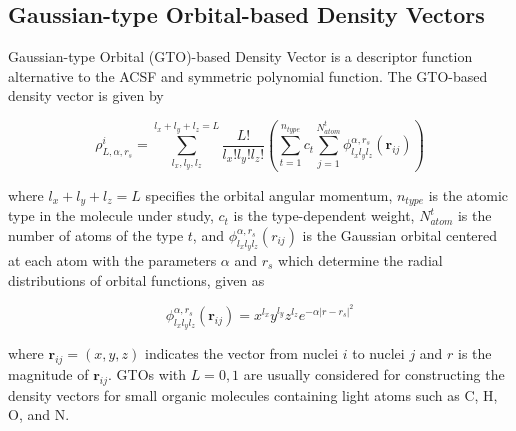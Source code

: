 \subsection{Gaussian-type Orbital-based Density Vectors}

Gaussian-type Orbital (GTO)-based Density Vector is a descriptor function alternative to 
the ACSF and symmetric polynomial function.\cite{kwac2021} The GTO-based density vector is given by

\begin{equation}
    \rho^{i}_{L,\alpha,r_{s}} = \sum^{l_{x}+l_{y}+l_{z} = L}_{l_{x},l_{y},l_{z}} 
    \frac{L!}{l_{x}!l_{y}!l_{z}!} \left ( \sum^{n_{type}}_{t=1} c_{t} \sum^{N^{t}_{atom}}_{j=1} 
    \phi^{\alpha,r_{s}}_{l_{x}l_{y}l_{z}} (\boldsymbol{r}_{ij}) \right )
\end{equation}

\noindent where $l_{x}+l_{y}+l_{z} = L$ specifies the orbital angular momentum, $n_{type}$ is the atomic type 
in the molecule under study, $c_{t}$ is the type-dependent weight, $N^{t}_{atom}$ is the number of atoms of 
the type $t$, and $\phi^{\alpha,r_{s}}_{l_{x}l_{y}l_{z}} (r_{ij})$ is the Gaussian orbital centered at 
each atom with the parameters $\alpha$ and $r_{s}$ which determine the radial distributions of orbital functions, 
given as

\begin{equation}
    \phi^{\alpha,r_{s}}_{l_{x}l_{y}l_{z}} (\boldsymbol{r}_{ij}) = x^{l_{x}}y^{l_{y}}z^{l_{z}} e^{-\alpha 
    |r-r_{s}|^{2}}
\end{equation}

\noindent where $\boldsymbol{r}_{ij} = (x,y,z)$ indicates the vector from nuclei $i$ to nuclei $j$ and $r$ 
is the magnitude of $\boldsymbol{r}_{ij}$. GTOs with $L=0,1$ are usually considered for constructing 
the density vectors for small organic molecules containing light atoms such as C, H, O, and N.\cite{kwac2021}
